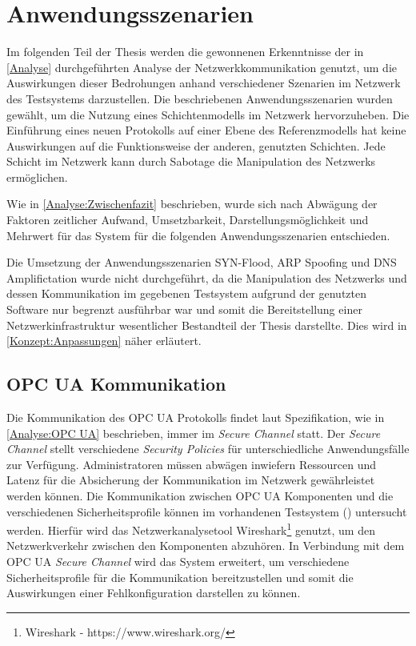 \chapter{Anwendungsszenarien}
\label{Anwendungsszenarien}
Im folgenden Teil der Thesis werden die gewonnenen Erkenntnisse der in \autoref{Analyse} durchgeführten Analyse der Netzwerkkommunikation genutzt, um die Auswirkungen dieser Bedrohungen anhand verschiedener Szenarien im Netzwerk des Testsystems darzustellen. Die beschriebenen Anwendungsszenarien wurden gewählt, um die Nutzung eines Schichtenmodells im Netzwerk hervorzuheben. Die Einführung eines neuen Protokolls auf einer Ebene des Referenzmodells hat keine Auswirkungen auf die Funktionsweise der anderen, genutzten Schichten. Jede Schicht im Netzwerk kann durch Sabotage die Manipulation des Netzwerks ermöglichen.

Wie in \autoref{Analyse:Zwischenfazit} beschrieben, wurde sich nach Abwägung der Faktoren zeitlicher Aufwand, Umsetzbarkeit, Darstellungsmöglichkeit und Mehrwert für das System für die folgenden Anwendungsszenarien entschieden.

Die Umsetzung der Anwendungsszenarien SYN-Flood, \ac{ARP} Spoofing und \ac{DNS} Amplifictation wurde nicht durchgeführt, da die Manipulation des Netzwerks und dessen Kommunikation im gegebenen Testsystem aufgrund der genutzten Software nur begrenzt ausführbar war und somit die Bereitstellung einer Netzwerkinfrastruktur wesentlicher Bestandteil der Thesis darstellte. Dies wird in \autoref{Konzept:Anpassungen} näher erläutert.

\section{OPC UA Kommunikation}
\label{Anwendungsszenarien:OPC UA Kommunikation}
Die Kommunikation des \ac{OPC UA} Protokolls findet laut Spezifikation, wie in \autoref{Analyse:OPC UA} beschrieben, immer im \textit{Secure Channel} statt. Der \textit{Secure Channel} stellt verschiedene \textit{Security Policies} für unterschiedliche Anwendungsfälle zur Verfügung. Administratoren müssen abwägen inwiefern Ressourcen und Latenz für die Absicherung der Kommunikation im Netzwerk gewährleistet werden können. Die Kommunikation zwischen \ac{OPC UA} Komponenten und die verschiedenen Sicherheitsprofile können im vorhandenen Testsystem (\cite{Weber2018}) untersucht werden. Hierfür wird das Netzwerkanalysetool Wireshark\footnote{Wireshark - https://www.wireshark.org/} genutzt, um den Netzwerkverkehr zwischen den Komponenten abzuhören. In Verbindung mit dem \ac{OPC UA} \textit{Secure Channel} wird das System erweitert, um verschiedene Sicherheitsprofile für die Kommunikation bereitzustellen und somit die Auswirkungen einer Fehlkonfiguration darstellen zu können.

